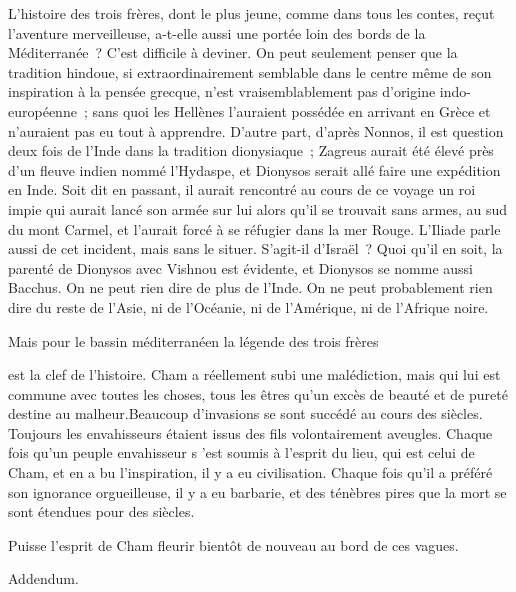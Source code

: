 \documentclass[french,twoside]{book} %
\begin{document}
L'histoire des trois frères, dont le plus jeune, comme dans tous les contes, reçut l'aventure merveilleuse, a-t-elle aussi une portée loin des bords de la Méditerranée ? C'est difficile à deviner. On peut seulement penser que la tradition hindoue, si extraordinairement semblable dans le centre même de son inspiration à la pensée grecque, n'est vraisemblablement pas d'origine indo-européenne ; sans quoi les Hellènes l'auraient possédée en arrivant en Grèce et n'auraient pas eu tout à apprendre. D'autre part, d'après Nonnos, il est question deux fois de l'Inde dans la tradition dionysiaque ; Zagreus aurait été élevé près d'un fleuve indien nommé l'Hydaspe, et Dionysos serait allé faire une expédition en Inde. Soit dit en passant, il aurait rencontré au cours de ce voyage un roi impie qui aurait lancé son armée sur lui alors qu'il se trouvait sans armes, au sud du mont Carmel, et l'aurait forcé à se réfugier dans la mer Rouge. L'Iliade parle aussi de cet incident, mais sans le situer. S'agit-il d'Israël ? Quoi qu'il en soit, la parenté de Dionysos avec Vishnou est évidente, et Dionysos se nomme aussi Bacchus. On ne peut rien dire de plus de l'Inde. On ne peut probablement rien dire du reste de l'Asie, ni de l'Océanie, ni de l'Amérique, ni de l'Afrique noire.\par
Mais pour le bassin méditerranéen la légende des trois frères\par
est la clef de l'histoire. Cham a réellement subi une malédiction, mais qui lui est commune avec toutes les choses, tous les êtres qu'un excès de beauté et de pureté destine au malheur.Beaucoup d'invasions se sont succédé au cours des siècles. Toujours les envahisseurs étaient issus des fils volontairement aveugles. Chaque fois qu'un peuple envahisseur s 'est soumis à l'esprit du lieu, qui est celui de Cham, et en a bu l'inspiration, il y a eu civilisation. Chaque fois qu'il a préféré son ignorance orgueilleuse, il y a eu barbarie, et des ténèbres pires que la mort se sont étendues pour des siècles.\par
Puisse l'esprit de Cham fleurir bientôt de nouveau au bord de ces vagues.\par

\begin{center}
\noindent Addendum.\par
\end{center}
\end{document}
